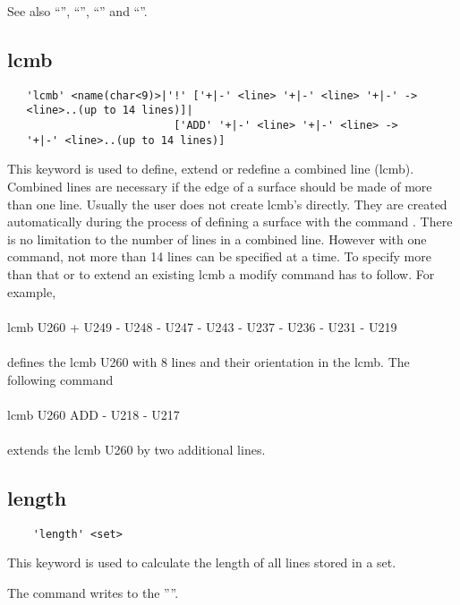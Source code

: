 \documentclass{article}
\begin{document}
See also ``'', ``'', ``'' and ``''.

\subsection{\label{lcmb}lcmb}
\begin{verbatim}
   'lcmb' <name(char<9)>|'!' ['+|-' <line> '+|-' <line> '+|-' ->
   <line>..(up to 14 lines)]|
                          ['ADD' '+|-' <line> '+|-' <line> ->
   '+|-' <line>..(up to 14 lines)]
\end{verbatim}
This keyword is used to define, extend or redefine a combined line (lcmb). Combined lines are necessary if the edge of a surface should be made of more than one line. Usually the user does not create lcmb's directly. They are created automatically during the process of defining a surface with the command . There is no limitation to the number of lines in a combined line. However with one command, not more than 14 lines can be specified at a time. To specify more than that or to extend an existing lcmb a modify command has to follow. For example,\\\\lcmb U260 + U249 - U248 - U247 - U243 - U237 - U236 - U231 - U219 \\\\defines the lcmb U260 with 8 lines and their orientation in the lcmb. The following command\\\\lcmb U260 ADD - U218 - U217\\\\extends the lcmb U260 by two additional lines.

\subsection{\label{length}length}
\begin{verbatim}
    'length' <set>
\end{verbatim}
This keyword is used to calculate the length of all lines stored in a set.

The command writes to the ''''.
\end{document}
